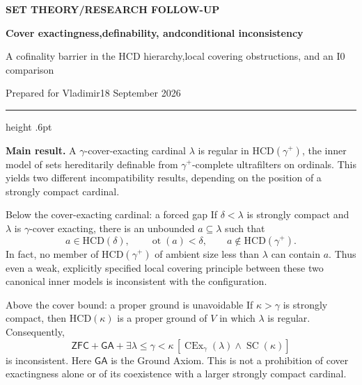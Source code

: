 \documentclass[11pt,letterpaper]{article}
\theoremstyle{definition}
\newcommand{\ZFC}{\mathsf{ZFC}}
\newcommand{\SC}{\operatorname{SC}}
\newcommand{\CEx}{\operatorname{CEx}}
\newcommand{\ot}{\operatorname{ot}}
\newcommand{\HCD}{\mathrm{HCD}}
\newcommand{\GA}{\mathsf{GA}}
\begin{document}
\thispagestyle{empty}
{\sffamily\bfseries\small\color{Olive}SET THEORY\quad /\quad RESEARCH FOLLOW-UP}

\vspace{13pt}
{\fontsize{28}{31}\selectfont\bfseries\color{Forest}Cover exactingness,\newline definability, and\newline conditional inconsistency\par}
\vspace{10pt}
{\fontsize{14}{18}\selectfont A cofinality barrier in the HCD hierarchy,\newline local covering obstructions, and an I0 comparison\par}
\vspace{14pt}
{\color{Muted}Prepared for Vladimir\hfill 18 September 2026\par}
\vspace{3pt}
{\color{Sage}\hrule height .6pt}
\vspace{12pt}

\textbf{Main result.} A $\gamma$-cover-exacting cardinal $\lambda$ is regular in
$\HCD(\gamma^+)$, the inner model of sets hereditarily definable from
$\gamma^+$-complete ultrafilters on ordinals. This yields two different
incompatibility results, depending on the position of a strongly compact cardinal.

\begin{assessment}{Below the cover-exacting cardinal: a forced gap}
If $\delta<\lambda$ is strongly compact and $\lambda$ is $\gamma$-cover exacting,
there is an unbounded $a\subseteq\lambda$ such that
\[
 a\in\HCD(\delta),\qquad \ot(a)<\delta,\qquad
 a\notin\HCD(\gamma^+).
\]
In fact, no member of $\HCD(\gamma^+)$ of ambient size less than $\lambda$
can contain $a$. Thus even a weak, explicitly specified local covering principle
between these two canonical inner models is inconsistent with the configuration.
\end{assessment}

\begin{assessment}{Above the cover bound: a proper ground is unavoidable}
If $\kappa>\gamma$ is strongly compact, then $\HCD(\kappa)$ is a proper ground
of $V$ in which $\lambda$ is regular. Consequently,
\[
 \ZFC+\GA+\exists\lambda\leq\gamma<\kappa\,
       [\CEx_\gamma(\lambda)\wedge\SC(\kappa)]
\]
is inconsistent. Here $\GA$ is the Ground Axiom. This is not a prohibition of
cover exactingness alone or of its coexistence with a larger strongly compact cardinal.
\end{assessment}
\end{document}
